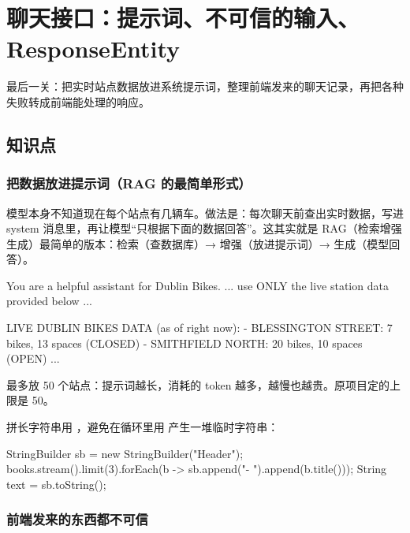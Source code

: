 \chapter{聊天接口：提示词、不可信的输入、ResponseEntity}

最后一关：把实时站点数据放进系统提示词，整理前端发来的聊天记录，再把各种失败转成前端能处理的响应。


\section{知识点}

\subsection{把数据放进提示词（RAG 的最简单形式）}

模型本身不知道现在每个站点有几辆车。做法是：每次聊天前查出实时数据，写进 system 消息里，再让模型“只根据下面的数据回答”。这其实就是 RAG（检索增强生成）最简单的版本：检索（查数据库）→ 增强（放进提示词）→ 生成（模型回答）。

\begin{plaincode}
You are a helpful assistant for Dublin Bikes. ... use ONLY the live station data provided below ...

LIVE DUBLIN BIKES DATA (as of right now):
- BLESSINGTON STREET: 7 bikes, 13 spaces (CLOSED)
- SMITHFIELD NORTH: 20 bikes, 10 spaces (OPEN)
...
\end{plaincode}

最多放 50 个站点：提示词越长，消耗的 token 越多，越慢也越贵。原项目定的上限是 50。

拼长字符串用 ，避免在循环里用 \code{+} 产生一堆临时字符串：

\begin{java}
StringBuilder sb = new StringBuilder("Header");
books.stream().limit(3).forEach(b -> sb.append("\n- ").append(b.title()));
String text = sb.toString();
\end{java}

\subsection{前端发来的东西都不可信}

